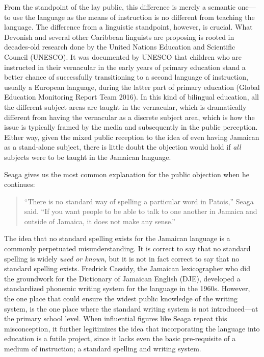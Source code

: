 \documentclass[output=paper,colorlinks,citecolor=brown]{langscibook}
\begin{document}
From the standpoint of the lay public, this difference is merely a semantic one—to use the language as the means of instruction is no different from teaching the language. The difference from a linguistic standpoint,  however, is crucial. What Devonish and several other Caribbean linguists are proposing is rooted in decades-old research done by the United Nations Education and Scientific Council (UNESCO). It was documented by UNESCO that children who are instructed in their vernacular in the early years of primary education stand a better chance of successfully transitioning to a second language of instruction, usually a European language, during the latter part of primary education (Global Education Monitoring Report Team 2016). In this kind of bilingual education, all the different subject areas are taught in the vernacular, which is dramatically different from having the vernacular as a discrete subject area, which is how the issue is typically framed by the media and subsequently in the public perception. Either way, given the mixed public reception to the idea of even having Jamaican as a stand-alone subject, there is little doubt the objection would hold if \emph{all} subjects were to be taught in the Jamaican language. 

Seaga gives us the most common explanation for the public objection when he continues: 

\begin{quote}
    “There is no standard way of spelling a particular word in Patois,” Seaga said. “If you want people to be able to talk to one another in Jamaica and outside of Jamaica, it does not make any sense.”
\end{quote}

The idea that no standard spelling exists for the Jamaican language is a commonly perpetuated misunderstanding. It is correct to say that no standard spelling is widely \emph{used or known}, but it is not in fact correct to say that no standard spelling exists. Fredrick Cassidy, the Jamaican lexicographer who did the groundwork for the Dictionary of Jamaican English (DJE), developed a standardized phonemic writing system for the language in the 1960s. However, the one place that could ensure the widest public knowledge of the writing system, is the one place where the standard writing system is not introduced—at the primary school level. When influential figures like Seaga repeat this misconception, it further legitimizes the idea that incorporating the language into education is a futile project, since it lacks even the basic pre-requisite of a medium of instruction; a standard spelling and writing system. 
\end{document}
